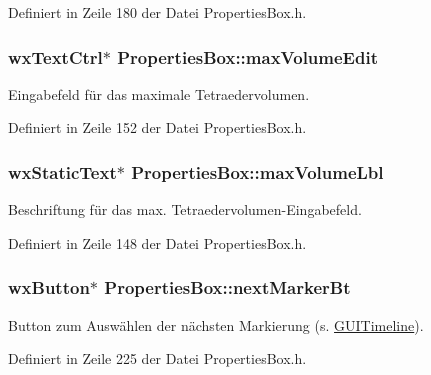 Definiert in Zeile 180 der Datei Properties\-Box.\-h.

\hypertarget{classPropertiesBox_ab738d2ef986a20be47a86bb676ae11db}{
\subsubsection[{max\-Volume\-Edit}]{\setlength{\rightskip}{0pt plus 5cm}wx\-Text\-Ctrl$\ast$ Properties\-Box\-::max\-Volume\-Edit\hspace{0.3cm}{\ttfamily [private]}}}\label{classPropertiesBox_ab738d2ef986a20be47a86bb676ae11db}
Eingabefeld für das maximale Tetraedervolumen. 

Definiert in Zeile 152 der Datei Properties\-Box.\-h.

\hypertarget{classPropertiesBox_ac37df12581fc6f63aa87b2807d62fdb5}{
\subsubsection[{max\-Volume\-Lbl}]{\setlength{\rightskip}{0pt plus 5cm}wx\-Static\-Text$\ast$ Properties\-Box\-::max\-Volume\-Lbl\hspace{0.3cm}{\ttfamily [private]}}}\label{classPropertiesBox_ac37df12581fc6f63aa87b2807d62fdb5}
Beschriftung für das max. Tetraedervolumen-\/\-Eingabefeld. 

Definiert in Zeile 148 der Datei Properties\-Box.\-h.

\hypertarget{classPropertiesBox_ad4a347a273ab780cf1ab941a5cf6d4b0}{
\subsubsection[{next\-Marker\-Bt}]{\setlength{\rightskip}{0pt plus 5cm}wx\-Button$\ast$ Properties\-Box\-::next\-Marker\-Bt\hspace{0.3cm}{\ttfamily [private]}}}\label{classPropertiesBox_ad4a347a273ab780cf1ab941a5cf6d4b0}
Button zum Auswählen der nächsten Markierung (s. \hyperlink{classGUITimeline}{G\-U\-I\-Timeline}). 

Definiert in Zeile 225 der Datei Properties\-Box.\-h.

